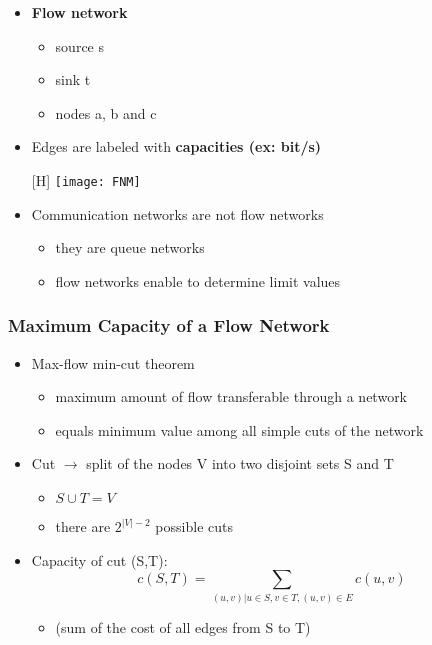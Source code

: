 \documentclass[../resumosRCOM.tex]{subfiles}
\begin{document}
\begin{itemize}
    \item \textbf{Flow network}
    \begin{itemize}
        \item source s
        \item sink t
        \item nodes a, b and c
    \end{itemize}
    \item Edges are labeled with \textbf{capacities (ex: bit/s)}
    \begin{center}[H]
        \texttt{[image: FNM]}
    \end{center}
    \item Communication networks are not flow networks
    \begin{itemize}
        \item they are queue networks
        \item flow networks enable to determine limit values
    \end{itemize}
\end{itemize}

\subsubsection{Maximum Capacity of a Flow Network}

\begin{itemize}
    \item Max-flow min-cut theorem
    \begin{itemize}
        \item maximum amount of flow transferable through a network
        \item equals minimum value among all simple cuts of the network
    \end{itemize}
    \item Cut $\rightarrow$ split of the nodes V into two disjoint sets S and T
    \begin{itemize}
        \item $S \cup T = V$
        \item there are $2^{|V|-2}$ possible cuts
    \end{itemize}
    \item Capacity of cut (S,T): \[c(S,T)=\sum_{(u,v) | u\in S,v\in T,(u,v)\in E}c(u,v)\]
    \begin{itemize}
        \item (sum of the cost of all edges from S to T)
    \end{itemize}
\end{itemize}
\end{document}
